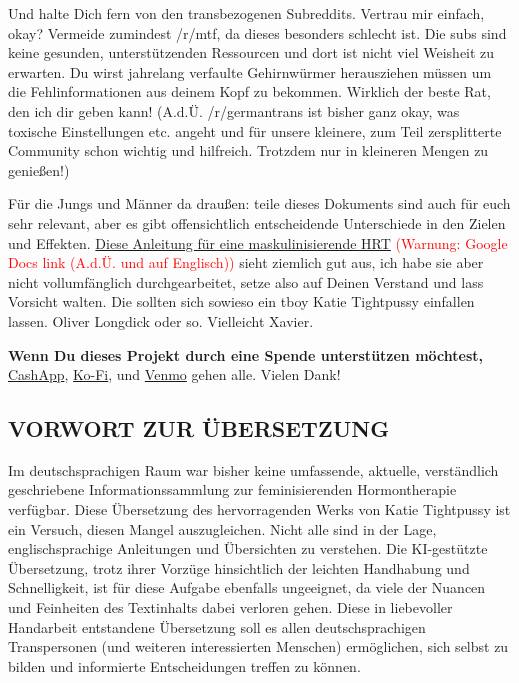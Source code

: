 \documentclass{article}
\begin{document}
Und halte Dich fern von den transbezogenen Subreddits. Vertrau mir einfach, okay? Vermeide zumindest /r/mtf, da dieses besonders schlecht ist. Die subs sind keine gesunden, unterstützenden Ressourcen und dort ist nicht viel Weisheit zu erwarten. Du wirst jahrelang verfaulte Gehirnwürmer herausziehen müssen um die Fehlinformationen aus deinem Kopf zu bekommen. Wirklich der beste Rat, den ich dir geben kann! (A.d.Ü. /r/germantrans ist bisher ganz okay, was toxische Einstellungen etc. angeht und für unsere kleinere, zum Teil zersplitterte Community schon wichtig und hilfreich. Trotzdem nur in kleineren Mengen zu genießen!)

Für die Jungs und Männer da draußen: teile dieses Dokuments sind auch für euch sehr relevant, aber es gibt offensichtlich entscheidende Unterschiede in den Zielen und Effekten. \href{https://docs.google.com/document/d/1DXFxzN0XTudPZez\_SO61fpqncRLPH\_Be\_QG\_8Pcz9LU/edit?tab=t.0}{Diese Anleitung für eine maskulinisierende HRT} \textcolor{red}{(Warnung: Google Docs link (A.d.Ü. und auf Englisch))} sieht ziemlich gut aus, ich habe sie aber nicht vollumfänglich durchgearbeitet, setze also auf Deinen Verstand und lass Vorsicht walten. Die sollten sich sowieso ein tboy Katie Tightpussy einfallen lassen. Oliver Longdick oder so. Vielleicht Xavier. 

\textbf{Wenn Du dieses Projekt durch eine Spende unterstützen möchtest,} \href{https://cash.app/Katitties}{CashApp}, \href{https://ko-fi.com/katitties}{Ko-Fi}, und \href{https://account.venmo.com/u/katitties}{Venmo} gehen alle. Vielen Dank!
																																																																																																																																																	
			  

\subsection{VORWORT ZUR ÜBERSETZUNG}

Im deutschsprachigen Raum war bisher keine umfassende, aktuelle, verständlich geschriebene Informationssammlung zur feminisierenden Hormontherapie verfügbar. Diese Übersetzung des hervorragenden Werks von Katie Tightpussy ist ein Versuch, diesen Mangel auszugleichen. Nicht alle sind in der Lage, englischsprachige Anleitungen und Übersichten zu verstehen. Die KI-gestützte Übersetzung, trotz ihrer Vorzüge hinsichtlich der leichten Handhabung und Schnelligkeit, ist für diese Aufgabe ebenfalls ungeeignet, da viele der Nuancen und Feinheiten des Textinhalts dabei verloren gehen. Diese in liebevoller Handarbeit entstandene Übersetzung soll es allen deutschsprachigen Transpersonen (und weiteren interessierten Menschen) ermöglichen, sich selbst zu bilden und informierte Entscheidungen treffen zu können. 
\end{document}
